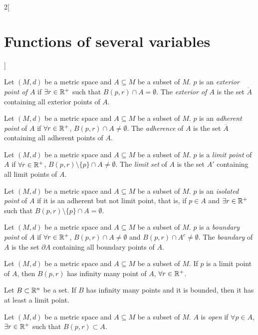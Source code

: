 \documentclass[../../../main.tex]{subfiles}
\begin{document}
\begin{multicols}{2}[\section{Functions of several variables}]
    \begin{definition}
        Let $(M,d)$ be a metric space and $A\subseteq M$ be a subset of $M$. $p$ is an \textit{exterior point of $A$} if $\exists r\in\mathbb{R}^+$ such that $B(p,r)\cap A=\emptyset$. The \textit{exterior of $A$} is the set $\mathring A$ containing all exterior points of $A$.
    \end{definition}
    \begin{definition}
        Let $(M,d)$ be a metric space and $A\subseteq M$ be a subset of $M$. $p$ is an \textit{adherent point} of $A$ if $\forall r\in\mathbb{R}^+$, $B(p,r)\cap A\ne\emptyset$. The \textit{adherence} of $A$ is the set $\overline{A}$ containing all adherent points of $A$.
    \end{definition}
    \begin{definition}
        Let $(M,d)$ be a metric space and $A\subseteq M$ be a subset of $M$. $p$ is a \textit{limit point} of $A$ if $\forall r\in\mathbb{R}^+$, $B(p,r)\setminus\{p\}\cap A\ne\emptyset$. The \textit{limit set} of $A$ is the set $A'$ containing all limit points of $A$.
    \end{definition}
    \begin{definition}
        Let $(M,d)$ be a metric space and $A\subseteq M$ be a subset of $M$. $p$ is an \textit{isolated point} of $A$ if it is an adherent but not limit point, that is, if $p\in A$ and $\exists r\in\mathbb{R}^+$ such that $B(p,r)\setminus\{p\}\cap A=\emptyset$.
    \end{definition}
    \begin{definition}
        Let $(M,d)$ be a metric space and $A\subseteq M$ be a subset of $M$. $p$ is a \textit{boundary point} of $A$ if $\forall r\in\mathbb{R}^+$, $B(p,r)\cap A\ne\emptyset$ and $B(p,r)\cap A^c\ne\emptyset$. The \textit{boundary} of $A$ is the set $\partial A$ containing all boundary points of $A$.
    \end{definition}
    \begin{prop}
        Let $(M,d)$ be a metric space and $A\subseteq M$ be a subset of $M$. If $p$ is a limit point of $A$, then $B(p,r)$ has infinity many point of $A$, $\forall r\in\mathbb{R}^+$.
    \end{prop}
    \begin{theorem}
        Let $B\subset\mathbb{R}^n$ be a set. If $B$ has infinity many points and it is bounded, then it has at least a limit point.
    \end{theorem}
    \begin{definition}
        Let $(M,d)$ be a metric space and $A\subseteq M$ be a subset of $M$. $A$ is \textit{open} if $\forall p\in A$, $\exists r\in\mathbb{R}^+$ such that $B(p,r)\subset A$.

\end{definition}
\end{multicols}
\end{document}
